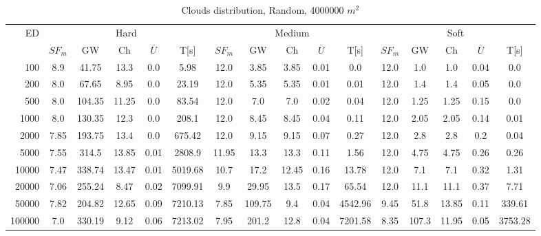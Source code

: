 \begin{table}[htb]
	\centering
	\footnotesize
	\begin{tabular}{|r|c|c|c|c|c|c|c|c|c|c|c|c|c|c|c|} 
		\hline
		\multirow{2}{*}{ED} & \multicolumn{5}{c|}{Hard} & \multicolumn{5}{c|}{Medium} &\multicolumn{5}{c|}{Soft} \\ 
		\cline{2-16} 
		&$SF_{m}$&GW & Ch & $\overline{U}$&T[s] &$SF_{m}$&GW & Ch & $\overline{U}$ &T[s] &$SF_{m}$&GW & Ch & $\overline{U}$  & T[s]  \\ 
		\hline 
		100 & 8.9 & 41.75 & 13.3 & 0.0 & 5.98 & 12.0 & 3.85 & 3.85 & 0.01 & 0.0 & 12.0 & 1.0 & 1.0 & 0.04 & 0.0\\ 
		200 & 8.0 & 67.65 & 8.95 & 0.0 & 23.19 & 12.0 & 5.35 & 5.35 & 0.01 & 0.01 & 12.0 & 1.4 & 1.4 & 0.05 & 0.0\\ 
		500 & 8.0 & 104.35 & 11.25 & 0.0 & 83.54 & 12.0 & 7.0 & 7.0 & 0.02 & 0.04 & 12.0 & 1.25 & 1.25 & 0.15 & 0.0\\ 
		1000 & 8.0 & 130.35 & 12.3 & 0.0 & 208.1 & 12.0 & 8.45 & 8.45 & 0.04 & 0.11 & 12.0 & 2.05 & 2.05 & 0.14 & 0.01\\ 
		2000 & 7.85 & 193.75 & 13.4 & 0.0 & 675.42 & 12.0 & 9.15 & 9.15 & 0.07 & 0.27 & 12.0 & 2.8 & 2.8 & 0.2 & 0.04\\ 
		5000 & 7.55 & 314.5 & 13.85 & 0.01 & 2808.9 & 11.95 & 13.3 & 13.3 & 0.11 & 1.56 & 12.0 & 4.75 & 4.75 & 0.26 & 0.26\\ 
		10000 & 7.47 & 338.74 & 13.47 & 0.01 & 5019.68 & 10.7 & 17.2 & 12.45 & 0.16 & 13.78 & 12.0 & 7.1 & 7.1 & 0.32 & 1.31\\ 
		20000 & 7.06 & 255.24 & 8.47 & 0.02 & 7099.91 & 9.9 & 29.95 & 13.5 & 0.17 & 65.54 & 12.0 & 11.1 & 11.1 & 0.37 & 7.71\\ 
		50000 & 7.82 & 204.82 & 12.65 & 0.09 & 7210.13 & 7.85 & 109.75 & 9.4 & 0.04 & 4542.96 & 9.45 & 51.8 & 13.85 & 0.11 & 339.61\\ 
		100000 & 7.0 & 330.19 & 9.12 & 0.06 & 7213.02 & 7.95 & 201.2 & 12.8 & 0.04 & 7201.58 & 8.35 & 107.3 & 11.95 & 0.05 & 3753.28\\ 
		\hline 
	\end{tabular} 
	\caption{Clouds distribution, Random, 4000000 $m^2$} 
	\label{tab:UnRandom2000} 
\end{table} 
